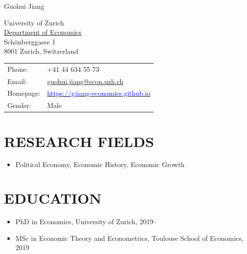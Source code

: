 \documentclass[letterpaper]{article}
\def\name{Guohui Jiang}
\begin{document}

{\huge \name}

\vspace{0.25in}

\begin{minipage}{0.45\linewidth}
  University of Zurich \\
  \href{https://www.econ.uzh.ch/en.html}{Department of Economics} \\
  Schönberggasse 1 \\
  8001 Zurich, Switzerland
\end{minipage}
\begin{minipage}{0.45\linewidth}
  \begin{tabular}{ll}
    Phone: & +41 44 634 55 73 \\
    Email: & \href{mailto:guohui.jiang@econ.uzh.ch}{guohui.jiang@econ.uzh.ch}\\
    Homepage: & \href{https://gjiang-economics.github.io}{\textcolor{blue}{https://gjiang-economics.github.io}} \\
    Gender: & Male
  \end{tabular}
\end{minipage}

\section*{\MakeUppercase{Research Fields}}
\begin{itemize}
	\item Political Economy, Economic History, Economic Growth
\end{itemize}

\section*{\MakeUppercase{education}}
\begin{itemize}
  \item PhD in Economics, University of Zurich, 2019--
  \item MSc in Economic Theory and Econometrics, Toulouse School of Economics, 2019

\end{itemize}
\end{document}
